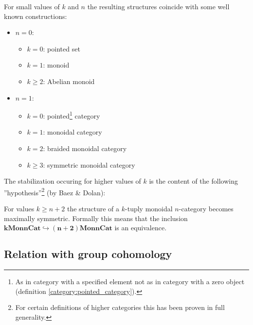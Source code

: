     \begin{example}
        For small values of $k$ and $n$ the resulting structures coincide with some well known constructions:
        \begin{itemize}
            \item $n=0$:
                \begin{itemize}
                    \item $k=0$: pointed set
                    \item $k=1$: monoid
                    \item $k\geq2$: Abelian monoid
                \end{itemize}
            \item $n=1$:
                \begin{itemize}
                    \item $k=0$: pointed\footnote{As in category with a specified element not as in category with a zero object (definition \ref{category:pointed_category}).} category
                    \item $k=1$: monoidal category
                    \item $k=2$: braided monoidal category
                    \item $k\geq3$: symmetric monoidal category
                \end{itemize}
        \end{itemize}
    \end{example}
    The stabilization occuring for higher values of $k$ is the content of the following ''hypothesis''\footnote{For certain definitions of higher categories this has been proven in full generality.} (by Baez \& Dolan):
    \begin{theorem}
        For values $k\geq n+2$ the structure of a $k$-tuply monoidal $n$-category becomes maximally symmetric. Formally this means that the inclusion \emph{$\boldsymbol{k}\textbf{Mon}\boldsymbol{n}\textbf{Cat}\hookrightarrow\boldsymbol{(n+2)}\textbf{Mon}\boldsymbol{n}\textbf{Cat}$} is an equivalence.
    \end{theorem}

\subsection[Relation with group cohomology]{Relation with group cohomology\footnotemark}

